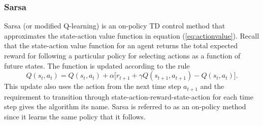 \subsubsection{Sarsa}
\label{sec:sarsa}
Sarsa (or modified Q-learning) is an on-policy TD control method that
approximates the state-action value function in equation
(\ref{eq:actionvalue}). Recall that the state-action value function for an
agent returns the total expected reward for following a particular policy for
selecting actions as a function of future states.  The function is updated
according to the rule
\begin{equation}
\label{eq:sarsa}
Q(s_t,a_t) = Q(s_t,a_t) + \alpha \bigl[r_{t+1} + \gamma
Q(s_{t+1},a_{t+1}) - Q(s_t,a_t)\bigr].
\end{equation}
This update also uses the action from the next time step $a_{t+1}$ and the
requirement to transition through state-action-reward-state-action for each
time step gives the algorithm its name.  Sarsa is referred to
as an on-policy method since it learns the same policy that it follows.

